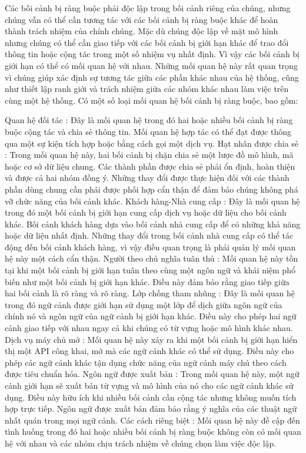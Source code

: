 Các bối cảnh bị ràng buộc phải độc lập trong bối cảnh riêng của chúng, nhưng chúng vẫn có thể cần tương tác với các bối cảnh bị ràng buộc khác để hoàn thành trách nhiệm của chính chúng. Mặc dù chúng độc lập về mặt mô hình nhưng chúng có thể cần giao tiếp với các bối cảnh bị giới hạn khác để trao đổi thông tin hoặc cộng tác trong một số nhiệm vụ nhất định. Vì vậy các bối cảnh bị giới hạn có thể có mối quan hệ với nhau. Những mối quan hệ này rất quan trọng vì chúng giúp xác định sự tương tác giữa các phần khác nhau của hệ thống, cũng như thiết lập ranh giới và trách nhiệm giữa các nhóm khác nhau làm việc trên cùng một hệ thống. Có một số loại mối quan hệ bối cảnh bị ràng buộc, bao gồm:

Quan hệ đối tác : Đây là mối quan hệ trong đó hai hoặc nhiều bối cảnh bị ràng buộc cộng tác và chia sẻ thông tin. Mối quan hệ hợp tác có thể đạt được thông qua một sự kiện tích hợp hoặc bằng cách gọi một dịch vụ.
Hạt nhân được chia sẻ : Trong mối quan hệ này, hai bối cảnh bị chặn chia sẻ một lược đồ mô hình, mã hoặc cơ sở dữ liệu chung. Các thành phần được chia sẻ phải ổn định, hoàn thiện và được cả hai nhóm đồng ý. Những thay đổi được thực hiện đối với các thành phần dùng chung cần phải được phối hợp cẩn thận để đảm bảo chúng không phá vỡ chức năng của bối cảnh khác.
Khách hàng-Nhà cung cấp : Đây là mối quan hệ trong đó một bối cảnh bị giới hạn cung cấp dịch vụ hoặc dữ liệu cho bối cảnh khác. Bối cảnh khách hàng dựa vào bối cảnh nhà cung cấp để có những khả năng hoặc dữ liệu nhất định. Những thay đổi trong bối cảnh nhà cung cấp có thể tác động đến bối cảnh khách hàng, vì vậy điều quan trọng là phải quản lý mối quan hệ này một cách cẩn thận.
Người theo chủ nghĩa tuân thủ : Mối quan hệ này tồn tại khi một bối cảnh bị giới hạn tuân theo cùng một ngôn ngữ và khái niệm phổ biến như một bối cảnh bị giới hạn khác. Điều này đảm bảo rằng giao tiếp giữa hai bối cảnh là rõ ràng và rõ ràng.
Lớp chống tham nhũng : Đây là mối quan hệ trong đó ngữ cảnh được giới hạn sử dụng một lớp để dịch giữa ngôn ngữ của chính nó và ngôn ngữ của ngữ cảnh bị giới hạn khác. Điều này cho phép hai ngữ cảnh giao tiếp với nhau ngay cả khi chúng có từ vựng hoặc mô hình khác nhau.
Dịch vụ máy chủ mở : Mối quan hệ này xảy ra khi một bối cảnh bị giới hạn hiển thị một API công khai, mở mà các ngữ cảnh khác có thể sử dụng. Điều này cho phép các ngữ cảnh khác tận dụng chức năng của ngữ cảnh máy chủ theo cách được tiêu chuẩn hóa.
Ngôn ngữ được xuất bản : Trong mối quan hệ này, một ngữ cảnh giới hạn sẽ xuất bản từ vựng và mô hình của nó cho các ngữ cảnh khác sử dụng. Điều này hữu ích khi nhiều bối cảnh cần cộng tác nhưng không muốn tích hợp trực tiếp. Ngôn ngữ được xuất bản đảm bảo rằng ý nghĩa của các thuật ngữ nhất quán trong mọi ngữ cảnh.
Các cách riêng biệt : Mối quan hệ này đề cập đến tình huống trong đó hai hoặc nhiều bối cảnh bị ràng buộc không còn có mối quan hệ với nhau và các nhóm chịu trách nhiệm về chúng chọn làm việc độc lập.

